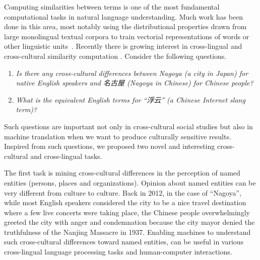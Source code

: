 Computing similarities between terms is one of the most fundamental
computational tasks in natural language understanding. Much work has been done
in this area, most notably using the distributional properties drawn from large monolingual textual
corpora to train vectorial representations of words or other 
linguistic units~\cite{Bengio2000ANP,pennington2014glove,Le2014DistributedRO}. 
Recently there is growing interest in cross-lingual and cross-cultural similarity computation \cite{luong2015bilingual,Garimella2016IdentifyingCD}.
Consider the following questions. 
\begin{enumerate}
\item {\em Is there any cross-cultural differences between Nagoya 
(a city in Japan) for native English speakers and 名古屋 (Nagoya in Chinese) for Chinese people?}
\item {\em What is the equivalent English terms  for ``浮云'' (a Chinese Internet slang term)?}
\end{enumerate}
Such questions are important not only in 
cross-cultural social studies but also in machine translation when we want to produce 
culturally sensitive results.  
Inspired from such questions, we proposed two novel and 
interesting cross-cultural and cross-lingual tasks.  

The first task is mining cross-cultural differences in
the perception of named entities (persons, places and organizations). 
Opinion about named entities can be very different from culture to culture. 
Back in 2012, in the case of ``Nagoya'', while most English speakers considered 
the city to be a nice travel destination where a few live concerts 
were taking place, 
the Chinese people overwhelmingly greeted the city with anger and 
condemnation because the city mayor denied the
truthfulness of the Nanjing Massacre in 1937. Enabling machines to understand
such cross-cultural differences toward named entities, can be useful in various
cross-lingual language processing tasks and human-computer interactions.


